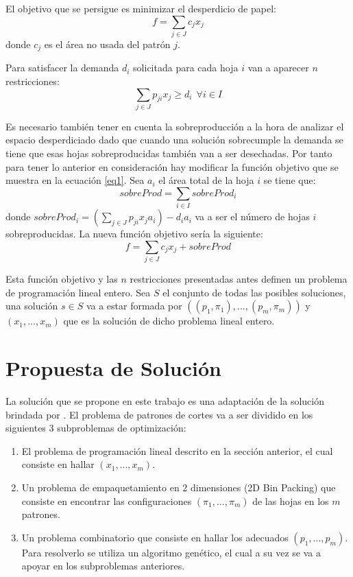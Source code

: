 \documentclass[a4paper,10pt,twocolumn]{article}
\begin{document}
El objetivo que se persigue es minimizar el desperdicio de papel:
\begin{equation}
f = \sum_{j \in J}c_j x_j
\label{eq1}
\end{equation}
donde $c_j$ es el área no usada del patrón $j$.

Para satisfacer la demanda $d_i$ solicitada para cada hoja $i$ van a aparecer $n$ restricciones:
\begin{equation}
\sum_{j \in J}p_{ji}x_j \geq  d_i \ \  \forall i \in I
\label{eq2}
\end{equation}

Es necesario también tener en cuenta la sobreproducción a la hora de analizar el espacio desperdiciado dado que cuando una solución sobrecumple la demanda se tiene que esas hojas sobreproducidas también van a ser desechadas. Por tanto para tener lo anterior en consideración hay modificar la función objetivo que se muestra en la ecuación \eqref{eq1}. Sea $a_i$ el área total de la hoja $i$ se tiene que:
 $$sobreProd = \sum_{i \in I} sobreProd_i $$ 
donde $sobreProd_i = (\sum_{j \in J} p_{ji}x_ja_i)  -  d_ia_i$ va a ser el número de hojas $i$ sobreproducidas.
La nueva función objetivo sería la siguiente:
\begin{equation}
f = \sum_{j \in J}c_j x_j + sobreProd
\label{eq3}
\end{equation}

Esta función objetivo y las $n$ restricciones presentadas antes definen un problema de programación lineal entero. Sea $S$ el conjunto de todas las posibles soluciones, una solución $s \in S$ va a estar formada por $((p_1,\pi_1),...,(p_m,\pi_m))$ y $(x_1,...,x_m)$ que es la solución de dicho problema lineal entero.


\section{Propuesta de Solución}
La solución que se propone en este trabajo es una adaptación de la solución brindada por \cite{4}. El problema de patrones de cortes va a ser dividido en los siguientes 3 subproblemas de optimización:
\begin{enumerate}
	\item El problema de programación lineal descrito en la sección anterior, el cual consiste en hallar $(x_1,...,x_m)$.
	\item Un problema de empaquetamiento en 2 dimensiones (2D Bin Packing) que consiste en encontrar las configuraciones $(\pi_1,...,\pi_m)$ de las hojas en los $m$ patrones.
	\item Un problema combinatorio que consiste en hallar los adecuados $(p_1,...,p_m)$. Para resolverlo se utiliza un algoritmo genético, el cual a su vez se va a apoyar en los subproblemas anteriores. 
\end{enumerate}
\end{document}
